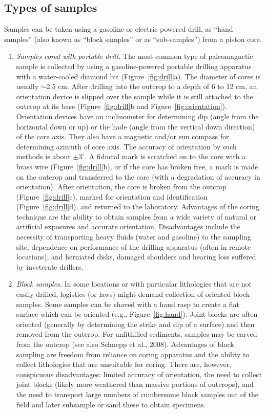 \subsection{Types of samples}

 Samples can be taken  using a gasoline or electric
powered drill,  as  ``hand samples'' (also known as ``block samples'' or as ``sub-samples'')  from a piston core.  

\begin{enumerate}  
\item {\it Samples cored with portable drill. }  The most common type of paleomagnetic sample is collected by
using a gasoline-powered portable drilling apparatus with a water-cooled diamond bit (Figure~\ref{fig:drill}a).
The diameter of cores is usually $\sim$2.5 cm. After drilling into the outcrop to a depth of 6 to 12 cm, 
an orientation device is slipped over the sample while it is still attached to the outcrop at its
base  (Figure~\ref{fig:drill}b and Figure~\ref{fig:orientation}).   Orientation devices have an inclinometer for determining dip (angle from the horizontal down or up) or the hade (angle from the vertical down direction)  of the
core axis.  They also have  a magnetic and/or sun compass  for determining azimuth of core axis. The accuracy
of orientation by such methods is about $\pm 3^{\circ}$. A fiducial mark is scratched on to the core with a brass wire (Figure~\ref{fig:drill}b), or if the core has broken free, a mark is made on the outcrop and transferred to the core (with a degradation of accuracy in orientation). 
After orientation, the core is broken from the
outcrop (Figure~\ref{fig:drill}c), marked for orientation and identification (Figure~\ref{fig:drill}d), and returned to the laboratory. Advantages
of the coring technique are the ability to obtain samples from a wide variety of natural or
artificial exposures and accurate orientation. Disadvantages include the necessity of transporting
heavy fluids (water and gasoline) to the sampling site, dependence on performance of the drilling
apparatus (often in remote locations), and herniated disks,  damaged shoulders  and hearing loss suffered by inveterate drillers.


\item {\it Block samples.}   In some locations or with particular lithologies that are not easily drilled, logistics (or
laws) might demand collection of oriented block samples. Some samples can be shaved with a hand rasp to create a flat surface which can be oriented (e.g., Figure~\ref{fig:hand}).  Joint blocks are often oriented (generally
by determining the strike and dip of a surface) and then removed from the outcrop.  For unlithified
sediments, samples may be carved from the outcrop (see also 
Schnepp et al., 2008). \nocite{schnepp08}   Advantages of block sampling are freedom
from reliance on coring apparatus and the ability to collect lithologies that are unsuitable for coring.
There are, however, conspicuous disadvantages: limited accuracy of orientation, the need to collect
joint blocks (likely more weathered than massive portions of outcrops), and the need to transport
large numbers of cumbersome block samples out of the field and later subsample or sand these to
obtain specimens.



\end{enumerate}
